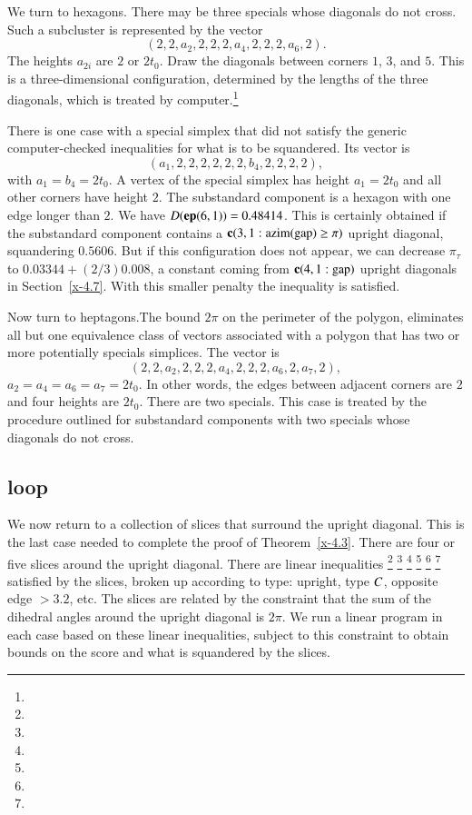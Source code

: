 We turn to hexagons. There may be three specials whose diagonals do not
cross.  Such a subcluster is represented by the vector
    $$(2,2,a_2,2,2,2,a_4,2,2,2,a_6,2).$$
The heights $a_{2i}$ are $2$ or $2t_0$.  Draw the diagonals between
corners $1$, $3$, and $5$.  This is a three-dimensional configuration,
determined by the lengths of the three diagonals, which is treated
by computer.\footnote{} %

There is one case with a special simplex that
did not satisfy the generic computer-checked inequalities for
what is to be squandered.  Its vector is
    $$(a_1,2,2,2,2,2,2,b_4,2,2,2,2),$$
with $a_1=b_4=2t_0$. A vertex of the special simplex has height
$a_1=2t_0$ and all other corners have height $2$.  The substandard component
is a hexagon with one edge longer than $2$.  We have $D({\operatorname{\bf ep}}{(6,1)})=
0.48414$. This is certainly obtained if the substandard component contains a
${\operatorname{\bf c}}{(3,1: {\operatorname{azim}}({\operatorname{gap}}) \ge \pi)}$ upright diagonal, squandering $0.5606$. But if this
configuration does not appear, we can decrease $\pi_\tau$ to
    $0.03344 + (2/3) 0.008$,
a constant coming from ${\operatorname{\bf c}}{(4,1:{\operatorname{gap}})}$ upright diagonals in
Section~\ref{x-4.7}. With this smaller penalty the inequality is
satisfied.

Now turn to heptagons.The bound $2\pi$  on the perimeter of the polygon,
eliminates all but one equivalence class of vectors associated with a
polygon that has two or more potentially specials simplices. The vector
is
    $$(2,2,a_2,2,2,2,a_4,2,2,2,a_6,2,a_7,2),$$
$a_2=a_4=a_6=a_7=2t_0$. In other words, the edges between adjacent
corners are $2$ and four heights are $2t_0$. There are two specials.
This case is treated by the procedure outlined for substandard components with two
specials whose diagonals do not cross.

\subsection{loop} %
    \label{sec:loops}

We now return to a collection of slices that surround
the upright diagonal.  This is the last case needed to complete
the proof of Theorem~\ref{x-4.3}. There are four or five 
slices around the upright diagonal.
There are linear inequalities%
\footnote{} %
\footnote{} %
\footnote{} %
\footnote{} %
\footnote{} %
\footnote{} %
satisfied by the slices, broken
up according to type: upright, type $C$, opposite edge $>3.2$,
etc. The slices are related by the constraint that the
sum of the dihedral angles around the upright diagonal is $2\pi$.
We run a linear program in each case based on these linear
inequalities, subject to this constraint to obtain bounds on the
score and what is squandered by the slices.

